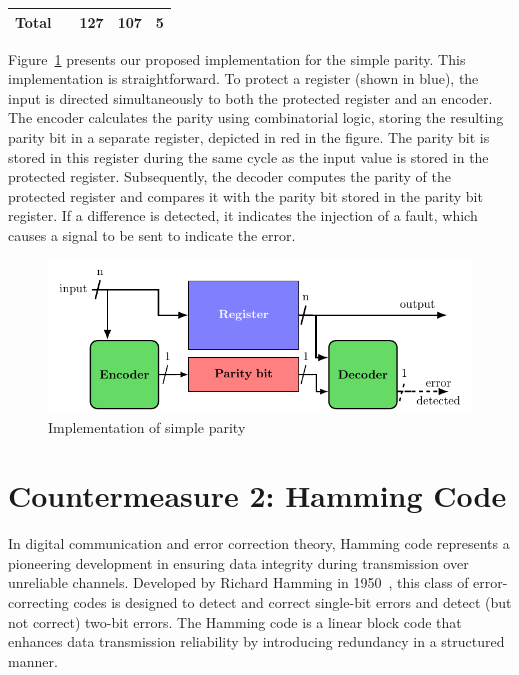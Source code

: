 \begin{table}[t]
\begin{tabular}{@{}ccccc@{}}
        Total   &                                                                                                   & 127                                                      & 107                                                                & 5                                                               \\
        \bottomrule
    \end{tabular}
\end{table}

Figure~\ref{fig:implementation_sp} presents our proposed implementation for the simple parity. This implementation is straightforward. To protect a register (shown in blue), the input is directed simultaneously to both the protected register and an encoder. The encoder calculates the parity using combinatorial logic, storing the resulting parity bit in a separate register, depicted in red in the figure. The parity bit is stored in this register during the same cycle as the input value is stored in the protected register. Subsequently, the decoder computes the parity of the protected register and compares it with the parity bit stored in the parity bit register. If a difference is detected, it indicates the injection of a fault, which causes a signal to be sent to indicate the error.

\begin{figure}[ht]
    \centering
    \includegraphics[page=1]{c5_countermeasures_dift/img/archi_contremesures.pdf}
    \caption{Implementation of simple parity}
    \label{fig:implementation_sp}
\end{figure}

\section{Countermeasure 2: Hamming Code}
\label{chapter:hammingcode}

In digital communication and error correction theory, Hamming code represents a pioneering development in ensuring data integrity during transmission over unreliable channels. Developed by Richard Hamming in 1950~\cite{H-50-bstj}, this class of error-correcting codes is designed to detect and correct single-bit errors and detect (but not correct) two-bit errors. The Hamming code is a linear block code that enhances data transmission reliability by introducing redundancy in a structured manner.


